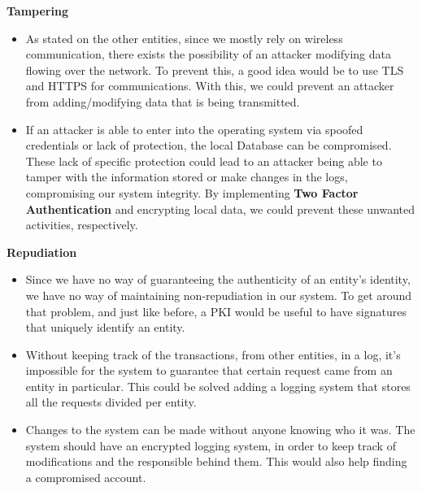 \textbf{Tampering}
\begin{itemize}
    \item As stated on the other entities, since we mostly rely on wireless communication, there exists the possibility of an attacker modifying data flowing over the network. To prevent this, a good idea would be to use TLS\cite{tls} and HTTPS for communications. With this, we could prevent an attacker from adding/modifying data that is being transmitted.
    \item If an attacker is able to enter into the operating system via spoofed credentials or lack of protection, the local Database can be compromised. These lack of specific protection could lead to an attacker being able to tamper with the information stored or make changes in the logs, compromising our system integrity. By implementing \textbf{Two Factor Authentication} and encrypting local data, we could prevent these unwanted activities, respectively.
\end{itemize}

\textbf{Repudiation}
\begin{itemize}
    \item Since we have no way of guaranteeing the authenticity of an entity's identity, we have no way of maintaining non-repudiation in our system. To get around that problem, and just like before, a PKI\cite{pki} would be useful to have signatures that uniquely identify an entity.
    \item Without keeping track of the transactions, from other entities, in a log, it's impossible for the system to guarantee that certain request came from an entity in particular. This could be solved adding a logging system that stores all the requests divided per entity.
    \item Changes to the system can be made without anyone knowing who it was. The system should have an encrypted logging system, in order to keep track of modifications and the responsible behind them. This would also help finding a compromised account.
\end{itemize}

